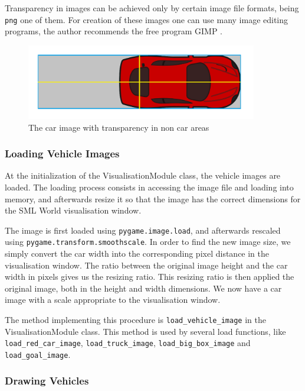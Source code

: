 Transparency in images can be achieved only by certain image file formats, being \texttt{png} one of them. For creation of these images one can use many image editing programs, the author recommends the free program GIMP \cite{GIMP}.

\begin{figure}[h!]
  \centering
    \includegraphics[width=0.9\textwidth]{car_image_explained_3}
    \caption{The car image with transparency in non car areas \label{fig:visualisation_module:car_image_explained_3} }
\end{figure}

\subsubsection{Loading Vehicle Images}

At the initialization of the VisualisationModule class, the vehicle images are loaded. The loading process consists in accessing the image file and loading into memory, and afterwards resize it so that the image has the correct dimensions for the SML World visualisation window.

The image is first loaded using \texttt{pygame.image.load}, and afterwards rescaled using \texttt{pygame.transform.smoothscale}. In order to find the new image size, we simply convert the car width into the corresponding pixel distance in the visualisation window. The ratio between the original image height and the car width in pixels gives us the resizing ratio. This resizing ratio is then applied the original image, both in the height and width dimensions. We now have a car image with a scale appropriate to the visualisation window.

The method implementing this procedure is \texttt{load\_vehicle\_image} in the VisualisationModule class. This method is used by several load functions, like \texttt{load\_red\_car\_image}, \texttt{load\_truck\_image}, \texttt{load\_big\_box\_image} and \texttt{load\_goal\_image}.

\subsubsection{Drawing Vehicles}

